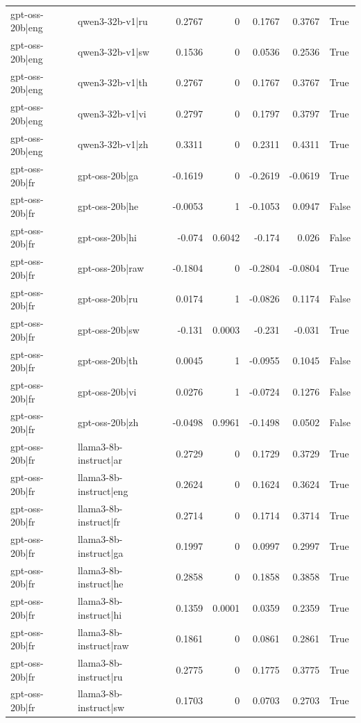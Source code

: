 \begin{table}
\begin{tabular}{l l r r r r l}
gpt-oss-20b|eng & qwen3-32b-v1|ru & 0.2767 & 0 & 0.1767 & 0.3767 & True \\
gpt-oss-20b|eng & qwen3-32b-v1|sw & 0.1536 & 0 & 0.0536 & 0.2536 & True \\
gpt-oss-20b|eng & qwen3-32b-v1|th & 0.2767 & 0 & 0.1767 & 0.3767 & True \\
gpt-oss-20b|eng & qwen3-32b-v1|vi & 0.2797 & 0 & 0.1797 & 0.3797 & True \\
gpt-oss-20b|eng & qwen3-32b-v1|zh & 0.3311 & 0 & 0.2311 & 0.4311 & True \\
gpt-oss-20b|fr & gpt-oss-20b|ga & -0.1619 & 0 & -0.2619 & -0.0619 & True \\
gpt-oss-20b|fr & gpt-oss-20b|he & -0.0053 & 1 & -0.1053 & 0.0947 & False \\
gpt-oss-20b|fr & gpt-oss-20b|hi & -0.074 & 0.6042 & -0.174 & 0.026 & False \\
gpt-oss-20b|fr & gpt-oss-20b|raw & -0.1804 & 0 & -0.2804 & -0.0804 & True \\
gpt-oss-20b|fr & gpt-oss-20b|ru & 0.0174 & 1 & -0.0826 & 0.1174 & False \\
gpt-oss-20b|fr & gpt-oss-20b|sw & -0.131 & 0.0003 & -0.231 & -0.031 & True \\
gpt-oss-20b|fr & gpt-oss-20b|th & 0.0045 & 1 & -0.0955 & 0.1045 & False \\
gpt-oss-20b|fr & gpt-oss-20b|vi & 0.0276 & 1 & -0.0724 & 0.1276 & False \\
gpt-oss-20b|fr & gpt-oss-20b|zh & -0.0498 & 0.9961 & -0.1498 & 0.0502 & False \\
gpt-oss-20b|fr & llama3-8b-instruct|ar & 0.2729 & 0 & 0.1729 & 0.3729 & True \\
gpt-oss-20b|fr & llama3-8b-instruct|eng & 0.2624 & 0 & 0.1624 & 0.3624 & True \\
gpt-oss-20b|fr & llama3-8b-instruct|fr & 0.2714 & 0 & 0.1714 & 0.3714 & True \\
gpt-oss-20b|fr & llama3-8b-instruct|ga & 0.1997 & 0 & 0.0997 & 0.2997 & True \\
gpt-oss-20b|fr & llama3-8b-instruct|he & 0.2858 & 0 & 0.1858 & 0.3858 & True \\
gpt-oss-20b|fr & llama3-8b-instruct|hi & 0.1359 & 0.0001 & 0.0359 & 0.2359 & True \\
gpt-oss-20b|fr & llama3-8b-instruct|raw & 0.1861 & 0 & 0.0861 & 0.2861 & True \\
gpt-oss-20b|fr & llama3-8b-instruct|ru & 0.2775 & 0 & 0.1775 & 0.3775 & True \\
gpt-oss-20b|fr & llama3-8b-instruct|sw & 0.1703 & 0 & 0.0703 & 0.2703 & True \\

\end{tabular}
\end{table}
